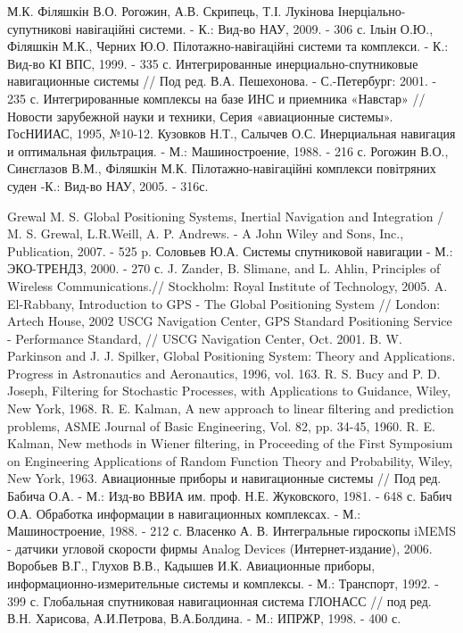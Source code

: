 \begin{thebibliography}{99}
 М.К. Філяшкін В.О. Рогожин, А.В. Скрипець, Т.І. Лукінова Інерціально-супутникові навігаційні  системи. - К.: Вид-во НАУ, 2009. - 306 с.
 Ільін О.Ю., Філяшкін М.К., Черних Ю.О. Пілотажно-навігаційні системи та комплекси. - К.: Вид-во КІ ВПС, 1999. - 335 с.
 Интегрированные инерциально-спутниковые навигационные системы // Под ред. В.А. Пешехонова. -  С.-Петербург: 2001. - 235 с.
 Интегрированные комплексы на базе ИНС и приемника «Навстар» // Новости зарубежной науки и техники, Серия «авиационные системы». ГосНИИАС, 1995, №10-12.
 Кузовков Н.Т., Салычев О.С. Инерциальная навигация и оптимальная фильтрация. - М.: Машиностроение, 1988.  - 216 с.
 Рогожин В.О., Синєглазов В.М., Філяшкін М.К. Пілотажно-навігаційні комплекси повітряних суден -К.: Вид-во НАУ, 2005. - 316с.

 Grewal M. S. Global Positioning Systems, Inertial Navigation and Integration / M. S. Grewal, L.R.Weill, A. P. Andrews. - A John Wiley and Sons, Inc., Publication, 2007. - 525 p.
 Соловьев Ю.А. Системы спутниковой навигации - М.: ЭКО-ТРЕНДЗ, 2000.  - 270 с. 
 J. Zander, B. Slimane, and L. Ahlin, Principles of Wireless Communications.// Stockholm: Royal Institute of Technology, 2005.
 A. El-Rabbany, Introduction to GPS - The Global Positioning System // London: Artech House, 2002
 USCG Navigation Center, GPS Standard Positioning Service - Performance Standard, // USCG Navigation Center, Oct. 2001.
 B. W. Parkinson and J. J. Spilker, Global Positioning System: Theory and
 Applications. Progress in Astronautics and Aeronautics, 1996, vol. 163.
 R. S. Bucy and P. D. Joseph, Filtering for Stochastic Processes, with Applications to Guidance, Wiley, New York, 1968.
 R. E. Kalman, A new approach to linear filtering and prediction problems, ASME Journal of Basic Engineering, Vol. 82, pp. 34-45, 1960.
 R. E. Kalman, New methods in Wiener filtering,  in Proceeding of the First Symposium on Engineering Applications of 
Random Function Theory and Probability, Wiley, New York, 1963.
 Авиационные приборы и навигационные системы // Под  ред. Бабича О.А. - М.: Изд-во ВВИА им. проф. Н.Е. Жуковского, 1981. - 648 с.
 Бабич О.А. Обработка информации в навигационных комплексах. - М.: Машиностроение, 1988.  - 212 с.
 Власенко А. В. Интегральные гироскопы iMEMS - датчики угловой скорости фирмы Analog Devices (Интернет-издание), 2006.
 Воробьев В.Г., Глухов В.В., Кадышев И.К. Авиационные приборы, информационно-измерительные системы и комплексы. - М.: Транспорт, 1992.  - 399 с.
 Глобальная спутниковая навигационная система ГЛОНАСС // под ред. В.Н. Харисова, А.И.Петрова, В.А.Болдина. - М.: ИПРЖР, 1998.  - 400 с. 
\end{thebibliography}

